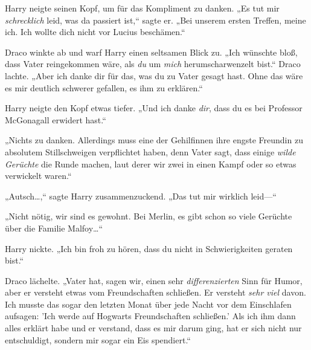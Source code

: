 Harry neigte seinen Kopf, um für das Kompliment zu danken. „Es tut mir \emph{schrecklich} leid, was da passiert ist,“ sagte er. „Bei unserem ersten Treffen, meine ich. Ich wollte dich nicht vor Lucius beschämen.“

Draco winkte ab und warf Harry einen seltsamen Blick zu. „Ich wünschte bloß, dass Vater reingekommen wäre, als \emph{du} um \emph{mich} herumscharwenzelt bist.“ Draco lachte. „Aber ich danke dir für das, was du zu Vater gesagt hast. Ohne das wäre es mir deutlich schwerer gefallen, es ihm zu erklären.“

Harry neigte den Kopf etwas tiefer. „Und ich danke \emph{dir}, dass du es bei Professor McGonagall erwidert hast.“

„Nichts zu danken. Allerdings muss eine der Gehilfinnen ihre engste Freundin zu absolutem Stillschweigen verpflichtet haben, denn Vater sagt, dass einige \emph{wilde Gerüchte} die Runde machen, laut derer wir zwei in einen Kampf oder so etwas verwickelt waren.“

„Autsch…,“ sagte Harry zusammenzuckend. „Das tut mir wirklich leid—“

„Nicht nötig, wir sind es gewohnt. Bei Merlin, es gibt schon so viele Gerüchte über die Familie Malfoy…“

Harry nickte. „Ich bin froh zu hören, dass du nicht in Schwierigkeiten geraten bist.“

Draco lächelte. „Vater hat, sagen wir, einen sehr \emph{differenzierten} Sinn für Humor, aber er versteht etwas vom Freundschaften schließen. Er versteht \emph{sehr viel} davon. Ich musste das sogar den letzten Monat über jede Nacht vor dem Einschlafen aufsagen: 'Ich werde auf Hogwarts Freundschaften schließen.' Als ich ihm dann alles erklärt habe und er verstand, dass es mir darum ging, hat er sich nicht nur entschuldigt, sondern mir sogar ein Eis spendiert.“


